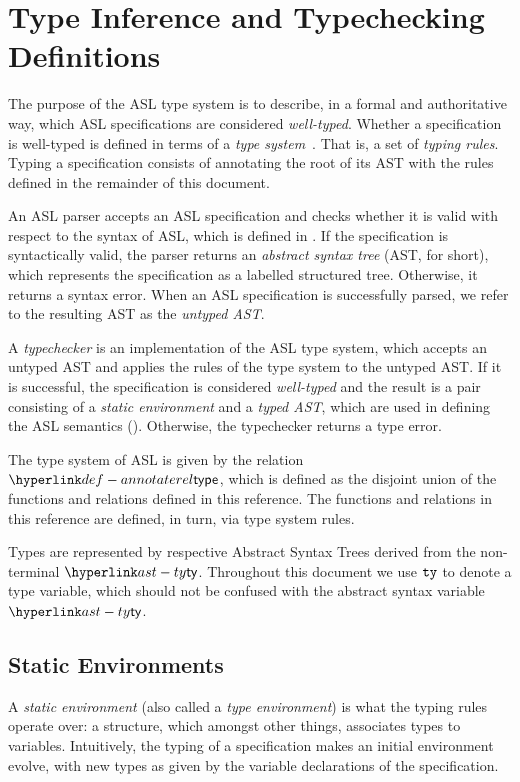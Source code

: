\chapter{Type Inference and Typechecking Definitions\label{chap:TypeChecking}}

The purpose of the ASL type system is to describe, in a formal and authoritative way,
which ASL specifications are considered \emph{well-typed}.
Whether a specification is well-typed is defined in terms of a \emph{type system}~\cite{TypeSystemsLucaCardelli}.
That is, a set of \emph{typing rules}.
Typing a specification consists of annotating the root of its AST with the rules defined
in the remainder of this document.

An ASL parser accepts an ASL specification and checks whether it is valid with respect to the syntax of ASL,
which is defined in .
If the specification is syntactically valid, the parser returns an \emph{abstract syntax tree} (AST, for short),
which represents the specification as a labelled structured tree. Otherwise, it returns a syntax error.
When an ASL specification is successfully parsed, we refer to the resulting AST as the \emph{untyped AST}.

A \emph{typechecker} is an implementation of the ASL type system, which accepts an untyped AST and applies the
rules of the type system to the untyped AST. If it is successful, the specification
is considered \emph{well-typed} and the result is a pair consisting of
a \emph{static environment} and a \emph{typed AST},
which are used in defining the ASL semantics ().
Otherwise, the typechecker returns a type error.

\hypertarget{def-annotaterel}{}
The type system of ASL is given by the relation $\annotaterel$, which is defined as the disjoint union
of the functions and relations defined in this reference.
The functions and relations in this reference are defined, in turn, via type system rules.

Types are represented by respective Abstract Syntax Trees derived from the non-terminal $\ty$.
Throughout this document we use $\texttt{ty}$ to denote a type variable, which should not be confused with the abstract syntax variable $\ty$.

\section{Static Environments \label{sec:StaticEnvironments}}

A \emph{static environment} (also called a \emph{type environment}) is what the typing rules operate over:
a structure, which amongst other things, associates types to variables.
Intuitively, the typing of a specification makes an initial environment evolve, with new types as given by the
variable declarations of the specification.

